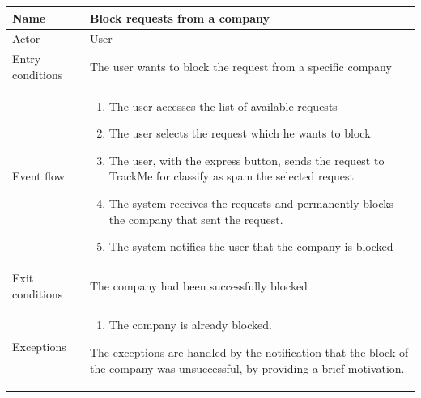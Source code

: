 \begin{table}[H]
\begin{tabularx}{\textwidth}{|l|X|}
\hline
 Name & Block requests from a company \\ \hline
 Actor & User \\ \hline
 Entry conditions & The user wants to block the request from a specific company \\ \hline
 Event flow & 
 \begin{enumerate}
 	\item The user accesses the list of available requests
  	\item The user selects the request which he wants to block
 	\item The user, with the express button, sends the request to TrackMe for classify as spam the selected request 
 	\item The system receives the requests and permanently blocks the company that sent the request.
 	\item The system notifies the user that the company is blocked
 \end{enumerate}   \\ \hline
 Exit conditions & The company had been successfully blocked \\ \hline
 Exceptions &  
 \begin{enumerate}
 	\item The company is already blocked.
 \end{enumerate}
 The exceptions are handled by the notification that the block of the company was unsuccessful, by providing a brief motivation.  
 \\ \hline
\end{tabularx}
\end{table}


